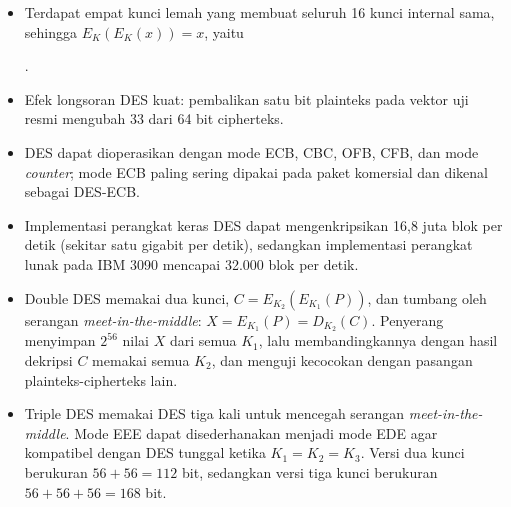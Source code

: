 \begin{itemize}
    \$10.000 dimenangkan DESCHALL, mesin EFF senilai \$250.000 berisi 1.856 chip
    pada 1998 menemukan kunci dalam sedikit lebih dari dua hari, dan gabungan
    mesin itu dengan lebih dari 100.000 komputer pada 1999 menemukan kunci
    kurang dari satu hari.
    \item Terdapat empat kunci lemah yang membuat seluruh 16 kunci internal
    sama, sehingga $E_K(E_K(x)) = x$, yaitu
    \begin{center}
    \small
     \quad {} \quad
     \quad {}.
    \end{center}
    \item Efek longsoran DES kuat: pembalikan satu bit plainteks pada vektor uji
    resmi mengubah 33 dari 64 bit cipherteks.
    \item DES dapat dioperasikan dengan mode ECB, CBC, OFB, CFB, dan mode
    \textit{counter}; mode ECB paling sering dipakai pada paket komersial dan
    dikenal sebagai DES-ECB.
    \item Implementasi perangkat keras DES dapat mengenkripsikan 16,8 juta blok
    per detik (sekitar satu gigabit per detik), sedangkan implementasi perangkat
    lunak pada IBM 3090 mencapai 32.000 blok per detik.
    \item Double DES memakai dua kunci, $C = E_{K_2}(E_{K_1}(P))$, dan tumbang
    oleh serangan \textit{meet-in-the-middle}: $X = E_{K_1}(P) = D_{K_2}(C)$.
    Penyerang menyimpan $2^{56}$ nilai $X$ dari semua $K_1$, lalu membandingkannya
    dengan hasil dekripsi $C$ memakai semua $K_2$, dan menguji kecocokan dengan
    pasangan plainteks-cipherteks lain.
    \item Triple DES memakai DES tiga kali untuk mencegah serangan
    \textit{meet-in-the-middle}. Mode EEE dapat disederhanakan menjadi mode EDE
    agar kompatibel dengan DES tunggal ketika $K_1=K_2=K_3$. Versi dua kunci
    berukuran $56+56=112$ bit, sedangkan versi tiga kunci berukuran
    $56+56+56=168$ bit.
\end{itemize}
